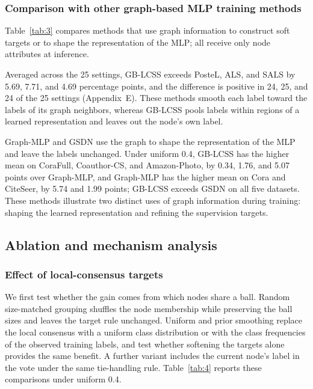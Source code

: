 \documentclass[10pt,letterpaper,nopreprintline]{elsarticle}
\theoremstyle{plain}
\begin{document}
\subsubsection{Comparison with other graph-based MLP training methods}\label{sec:4.2.2}

Table~\ref{tab:3} compares methods that use graph information to construct soft targets or to shape the representation of the MLP; all receive only node attributes at inference.



Averaged across the 25 settings, GB-LCSS exceeds PosteL, ALS, and SALS by 5.69, 7.71, and 4.69 percentage points, and the difference is positive in 24, 25, and 24 of the 25 settings (Appendix~E). These methods smooth each label toward the labels of its graph neighbors, whereas GB-LCSS pools labels within regions of a learned representation and leaves out the node's own label.

Graph-MLP and GSDN use the graph to shape the representation of the MLP and leave the labels unchanged. Under uniform 0.4, GB-LCSS has the higher mean on CoraFull, Coauthor-CS, and Amazon-Photo, by 0.34, 1.76, and 5.07 points over Graph-MLP, and Graph-MLP has the higher mean on Cora and CiteSeer, by 5.74 and 1.99 points; GB-LCSS exceeds GSDN on all five datasets. These methods illustrate two distinct uses of graph information during training: shaping the learned representation and refining the supervision targets.

\subsection{Ablation and mechanism analysis}\label{sec:4.3}

\subsubsection{Effect of local-consensus targets}\label{sec:4.3.1}

We first test whether the gain comes from which nodes share a ball. Random size-matched grouping shuffles the node membership while preserving the ball sizes and leaves the target rule unchanged. Uniform and prior smoothing replace the local consensus with a uniform class distribution or with the class frequencies of the observed training labels, and test whether softening the targets alone provides the same benefit. A further variant includes the current node's label in the vote under the same tie-handling rule. Table~\ref{tab:4} reports these comparisons under uniform 0.4.
\end{document}
